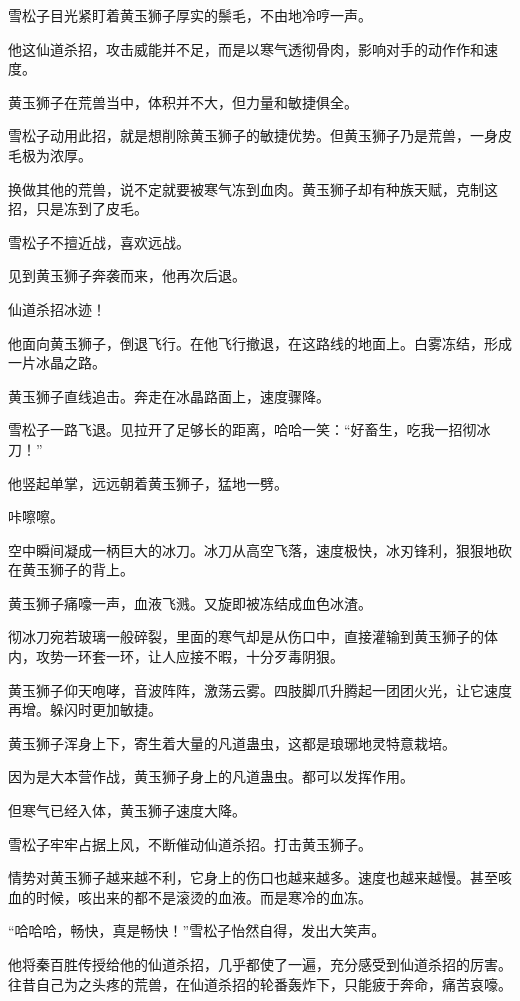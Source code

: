 \begin{this_body}
雪松子目光紧盯着黄玉狮子厚实的鬃毛，不由地冷哼一声。

他这仙道杀招，攻击威能并不足，而是以寒气透彻骨肉，影响对手的动作作和速度。

黄玉狮子在荒兽当中，体积并不大，但力量和敏捷俱全。

雪松子动用此招，就是想削除黄玉狮子的敏捷优势。但黄玉狮子乃是荒兽，一身皮毛极为浓厚。

换做其他的荒兽，说不定就要被寒气冻到血肉。黄玉狮子却有种族天赋，克制这招，只是冻到了皮毛。

雪松子不擅近战，喜欢远战。

见到黄玉狮子奔袭而来，他再次后退。

仙道杀招冰迹！

他面向黄玉狮子，倒退飞行。在他飞行撤退，在这路线的地面上。白雾冻结，形成一片冰晶之路。

黄玉狮子直线追击。奔走在冰晶路面上，速度骤降。

雪松子一路飞退。见拉开了足够长的距离，哈哈一笑：“好畜生，吃我一招彻冰刀！”

他竖起单掌，远远朝着黄玉狮子，猛地一劈。

咔嚓嚓。

空中瞬间凝成一柄巨大的冰刀。冰刀从高空飞落，速度极快，冰刃锋利，狠狠地砍在黄玉狮子的背上。

黄玉狮子痛嚎一声，血液飞溅。又旋即被冻结成血色冰渣。

彻冰刀宛若玻璃一般碎裂，里面的寒气却是从伤口中，直接灌输到黄玉狮子的体内，攻势一环套一环，让人应接不暇，十分歹毒阴狠。

黄玉狮子仰天咆哮，音波阵阵，激荡云雾。四肢脚爪升腾起一团团火光，让它速度再增。躲闪时更加敏捷。

黄玉狮子浑身上下，寄生着大量的凡道蛊虫，这都是琅琊地灵特意栽培。

因为是大本营作战，黄玉狮子身上的凡道蛊虫。都可以发挥作用。

但寒气已经入体，黄玉狮子速度大降。

雪松子牢牢占据上风，不断催动仙道杀招。打击黄玉狮子。

情势对黄玉狮子越来越不利，它身上的伤口也越来越多。速度也越来越慢。甚至咳血的时候，咳出来的都不是滚烫的血液。而是寒冷的血冻。

“哈哈哈，畅快，真是畅快！”雪松子怡然自得，发出大笑声。

他将秦百胜传授给他的仙道杀招，几乎都使了一遍，充分感受到仙道杀招的厉害。往昔自己为之头疼的荒兽，在仙道杀招的轮番轰炸下，只能疲于奔命，痛苦哀嚎。


\end{this_body}
